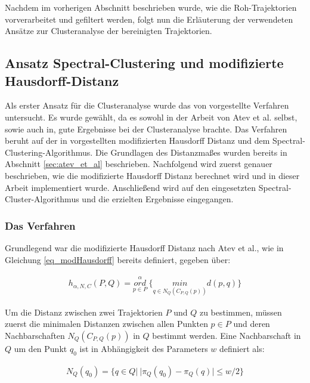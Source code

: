 Nachdem im vorherigen Abschnitt beschrieben wurde, wie die Roh-Trajektorien vorverarbeitet und gefiltert
werden, folgt nun die Erläuterung der verwendeten Ansätze zur Clusteranalyse der bereinigten Trajektorien.

\subsection{Ansatz Spectral-Clustering und modifizierte Hausdorff-Distanz}
\label{sec:real_ansatz_spec_modHD}

Als erster Ansatz für die Clusteranalyse wurde das von \cite[]{Atev2010} vorgestellte Verfahren untersucht.
Es wurde gewählt, da es sowohl in der Arbeit von Atev et al. selbst, sowie auch in\cite[]{Morris2009}, gute Ergebnisse
bei der Clusteranalyse brachte.
Das Verfahren beruht auf der in \cite[]{Atev2006} vorgestellten modifizierten Hausdorff Distanz und dem
Spectral-Clustering-Algorithmus. Die Grundlagen des Distanzmaßes wurden bereits in Abschnitt
\ref{sec:atev_et_al} beschrieben. Nachfolgend wird zuerst genauer beschrieben, wie die
modifizierte Hausdorff Distanz berechnet wird und in dieser Arbeit implementiert wurde. Anschließend
wird auf den eingesetzten Spectral-Cluster-Algorithmus und die erzielten Ergebnisse eingegangen.

\subsubsection{Das Verfahren}

Grundlegend war die modifizierte Hausdorff Distanz nach Atev et al., wie in Gleichung \ref{eq_modHausdorff}
bereits definiert, gegeben über:

\begin{ceqn}
\begin{align*}
    h_{\alpha, N, C}(P, Q) = \overset{\alpha}{\underset{p \in P}{ord}}\ \Big\{ \underset{q \in N_Q(C_{P,Q}(p))}{min} d(p, q) \Big\}
\end{align*}
\end{ceqn}

Um die Distanz zwischen zwei Trajektorien $P$ und $Q$ zu bestimmen, müssen zuerst die minimalen Distanzen
zwischen allen Punkten $p \in P$ und deren Nachbarschaften $N_Q(C_{P,Q}(p))$ in $Q$ bestimmt werden.
Eine Nachbarschaft in $Q$ um den Punkt $q_0$ ist in Abhängigkeit des Parameters $w$ definiert als:

\begin{ceqn}
\begin{align}
    N_Q(q_0) = \{ q \in Q |\ |\pi_Q(q_0) - \pi_Q(q)| \le w/2 \}
\end{align}
\end{ceqn}

